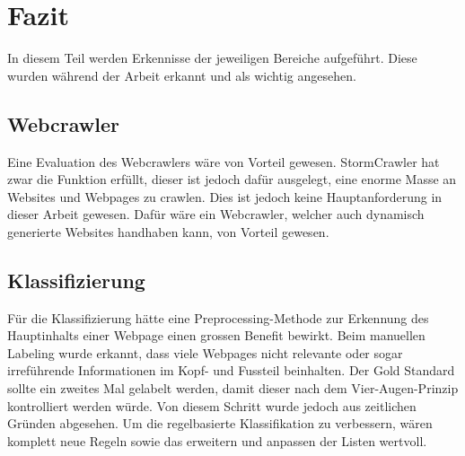\chapter{Fazit}
In diesem Teil werden Erkennisse der jeweiligen Bereiche aufgeführt.
Diese wurden während der Arbeit erkannt und als wichtig angesehen.
\section{Webcrawler}
Eine Evaluation des Webcrawlers wäre von Vorteil gewesen.
StormCrawler hat zwar die Funktion erfüllt, dieser ist jedoch dafür ausgelegt, eine enorme Masse an Websites und Webpages zu crawlen.
Dies ist jedoch keine Hauptanforderung in dieser Arbeit gewesen.
Dafür wäre ein Webcrawler, welcher auch dynamisch generierte Websites handhaben kann, von Vorteil gewesen.
\section{Klassifizierung}
Für die Klassifizierung hätte eine Preprocessing-Methode zur Erkennung des Hauptinhalts einer Webpage einen grossen Benefit bewirkt.
Beim manuellen Labeling wurde erkannt, dass viele Webpages nicht relevante oder sogar irreführende Informationen im Kopf- und Fussteil beinhalten.
Der Gold Standard sollte ein zweites Mal gelabelt werden, damit dieser nach dem Vier-Augen-Prinzip kontrolliert werden würde.
Von diesem Schritt wurde jedoch aus zeitlichen Gründen abgesehen.
Um die regelbasierte Klassifikation zu verbessern, wären komplett neue Regeln sowie das erweitern und anpassen der Listen wertvoll.